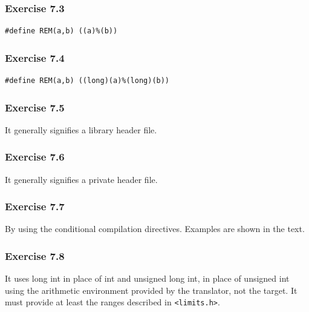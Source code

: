   

  \subsubsection*{Exercise 7.3}

   \begin{Verbatim}
#define REM(a,b) ((a)%(b))
\end{Verbatim}

  

  \subsubsection*{Exercise 7.4}

   \begin{Verbatim}
#define REM(a,b) ((long)(a)%(long)(b))
\end{Verbatim}

  

  \subsubsection*{Exercise 7.5}

   It generally signifies a library header file.


  

  \subsubsection*{Exercise 7.6}

   It generally signifies a private header file.


  

  \subsubsection*{Exercise 7.7}

   By using the conditional compilation directives. Examples are shown in
    the text.


  

  \subsubsection*{Exercise 7.8}

   It uses long int in place of int and unsigned long int, in place of
    unsigned int using the arithmetic environment provided by the translator,
    not the target. It must provide at least the ranges described in
    \texttt{<limits.h>}.


  

 
